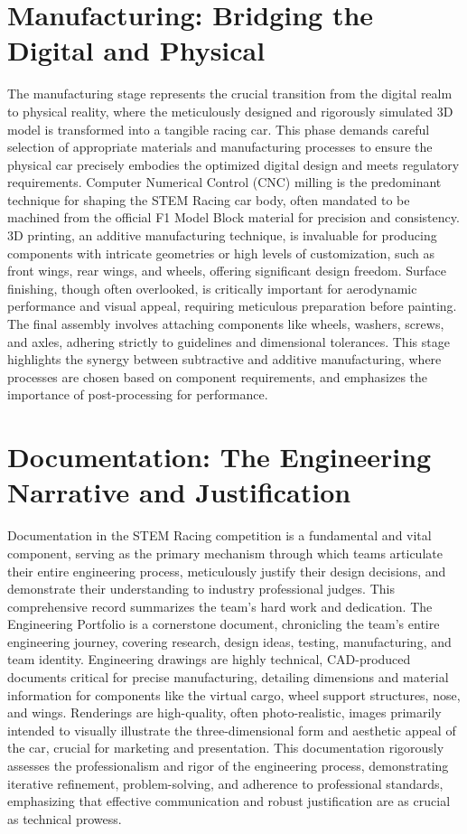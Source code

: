 \section{Manufacturing: Bridging the Digital and Physical}

The manufacturing stage represents the crucial transition from the digital realm to physical reality, where the meticulously designed and rigorously simulated 3D model is transformed into a tangible racing car. This phase demands careful selection of appropriate materials and manufacturing processes to ensure the physical car precisely embodies the optimized digital design and meets regulatory requirements. Computer Numerical Control (CNC) milling is the predominant technique for shaping the STEM Racing car body, often mandated to be machined from the official F1 Model Block material for precision and consistency. 3D printing, an additive manufacturing technique, is invaluable for producing components with intricate geometries or high levels of customization, such as front wings, rear wings, and wheels, offering significant design freedom. Surface finishing, though often overlooked, is critically important for aerodynamic performance and visual appeal, requiring meticulous preparation before painting. The final assembly involves attaching components like wheels, washers, screws, and axles, adhering strictly to guidelines and dimensional tolerances. This stage highlights the synergy between subtractive and additive manufacturing, where processes are chosen based on component requirements, and emphasizes the importance of post-processing for performance.

\section{Documentation: The Engineering Narrative and Justification}

Documentation in the STEM Racing competition is a fundamental and vital component, serving as the primary mechanism through which teams articulate their entire engineering process, meticulously justify their design decisions, and demonstrate their understanding to industry professional judges. This comprehensive record summarizes the team's hard work and dedication. The Engineering Portfolio is a cornerstone document, chronicling the team's entire engineering journey, covering research, design ideas, testing, manufacturing, and team identity. Engineering drawings are highly technical, CAD-produced documents critical for precise manufacturing, detailing dimensions and material information for components like the virtual cargo, wheel support structures, nose, and wings. Renderings are high-quality, often photo-realistic, images primarily intended to visually illustrate the three-dimensional form and aesthetic appeal of the car, crucial for marketing and presentation. This documentation rigorously assesses the professionalism and rigor of the engineering process, demonstrating iterative refinement, problem-solving, and adherence to professional standards, emphasizing that effective communication and robust justification are as crucial as technical prowess.
